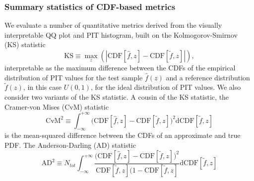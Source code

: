 \subsubsection{Summary statistics of CDF-based metrics}
\label{sec:summqqpit}

We evaluate a number of quantitative metrics derived from the visually interpretable QQ plot and PIT histogram, built on the Kolmogorov-Smirnov (KS) statistic
\begin{equation}
  \label{eq:ks}
  \mathrm{KS} \equiv \max_{z} \left( \left| \mathrm{CDF}[\hat{f}, z] - \mathrm{CDF}[\tilde{f}, z] \right| \right),
\end{equation}
interpretable as the maximum difference between the CDFs of the empirical distribution of PIT values for the test sample $\hat{f}(z)$ and a reference distribution $\tilde{f}(z)$, in this case $U(0,1)$, for the ideal distribution of PIT values.
We also consider two variants of the KS statistic.
A cousin of the KS statistic, the Cramer-von Mises (CvM) statistic
\begin{equation}
\label{eq:cvm}
  \mathrm{CvM}^{2} \equiv \int_{-\infty}^{+\infty} \big(\mathrm{CDF}[\hat{f}, z] - \mathrm{CDF}[\tilde{f}, z]\big)^2 \mathrm{d}\mathrm{CDF}[\tilde{f}, z]
\end{equation}
is the mean-squared difference between the CDFs of an approximate and true PDF.
The Anderson-Darling (AD) statistic
\begin{equation} \label{eq:ad}
  \mathrm{AD}^2 \equiv N_{tot}\int_{-\infty}^{+\infty} \frac{\big(\mathrm{CDF}[\hat{f}, z] - \mathrm{CDF}[\tilde{f}, z]\big)^2} {\mathrm{CDF}[\tilde{f}, z] (1 -\mathrm{CDF}[\tilde{f}, z]} \mathrm{d}\mathrm{CDF}[\tilde{f}, z]
\end{equation}
